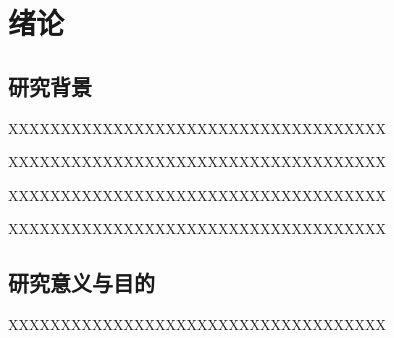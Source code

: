 \documentclass[../article.tex]{subfiles} %
\begin{document}
\section{绪论}
\subsection{研究背景}

XXXXXXXXXXXXXXXXXXXXXXXXXXXXXXXXXXXX

XXXXXXXXXXXXXXXXXXXXXXXXXXXXXXXXXXXX

XXXXXXXXXXXXXXXXXXXXXXXXXXXXXXXXXXXX

XXXXXXXXXXXXXXXXXXXXXXXXXXXXXXXXXXXX

\subsection{研究意义与目的}

XXXXXXXXXXXXXXXXXXXXXXXXXXXXXXXXXXXX
\end{document}
